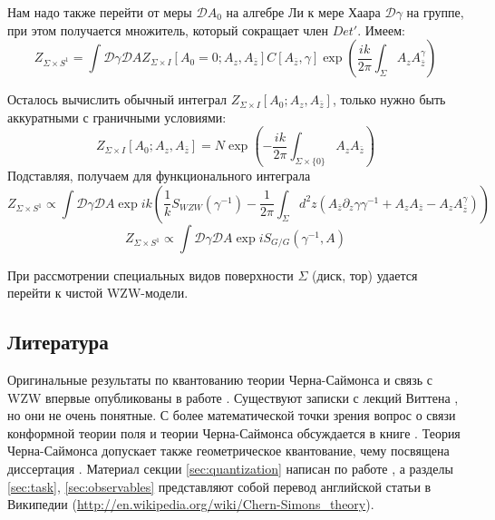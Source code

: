 \documentclass[a4paper,12pt]{article}
\theoremstyle{definition} \newtheorem{Def}{Definition}
\begin{document}
Нам надо также перейти от меры $\mathcal{D}A_0$ на алгебре Ли к мере Хаара $\mathcal{D}\gamma$ на группе, при этом получается множитель, который сокращает член $Det'$. Имеем:
\begin{equation}
  \label{eq:29}
   Z_{\Sigma\times S^1}=\int \mathcal{D}\gamma\mathcal{D}A Z_{\Sigma\times I}[A_0=0; A_z, A_{\bar z}] C[A_{\bar z},\gamma] \exp\left(\frac{ik}{2\pi}\int_{\Sigma}A_z A_{\bar z}^{\gamma}\right) 
\end{equation}

Осталось вычислить обычный интеграл $Z_{\Sigma\times I}[A_0;A_z,A_{\bar z}]$, только нужно быть аккуратными с граничными условиями:
\begin{equation}
  \label{eq:30}
  Z_{\Sigma\times I}[A_0;A_z,A_{\bar z}]= N \exp \left( -\frac{ik}{2\pi}\int_{\Sigma\times\{0\}} A_z A_{\bar z}\right)
\end{equation}
Подставляя, получаем для функционального интеграла
\begin{equation}
  \label{eq:31}
    Z_{\Sigma\times S^1}\propto\int \mathcal{D}\gamma\mathcal{D}A \exp ik\left(\frac{1}{k}S_{WZW}(\gamma^{-1})-\frac{1}{2\pi}\int_{\Sigma}d^2z (A_{\bar z}\partial_z \gamma \gamma^{-1}+A_zA_{\bar z}-A_z A_{\bar z}^{\gamma})\right)
\end{equation}
\begin{equation}
  \label{eq:32}
  Z_{\Sigma\times S^1}\propto\int \mathcal{D}\gamma\mathcal{D}A \exp iS_{G/G}(\gamma^{-1},A)
\end{equation}

При рассмотрении специальных видов поверхности $\Sigma$ (диск, тор) удается перейти к чистой WZW-модели.

\subsection{Литература}
\label{sec:cs-literature}

Оригинальные результаты по квантованию теории Черна-Саймонса и связь с WZW впервые опубликованы в работе \cite{witten1989quantum}. Существуют записки с лекций Виттена \cite{hu2001lecture}, но они не очень понятные. С более математической точки зрения вопрос о связи конформной теории поля и теории Черна-Саймонса обсуждается в книге \cite{kohno2002conformal}. Теория Черна-Саймонса допускает также геометрическое квантование, чему посвящена диссертация \cite{axelrod1991geometric}. Материал секции \ref{sec:quantization} написан по работе \cite{blau1993derivation}, а разделы \ref{sec:task}, \ref{sec:observables} представляют собой перевод английской статьи в Википедии (\url{http://en.wikipedia.org/wiki/Chern-Simons_theory}).

{}

\end{document}
